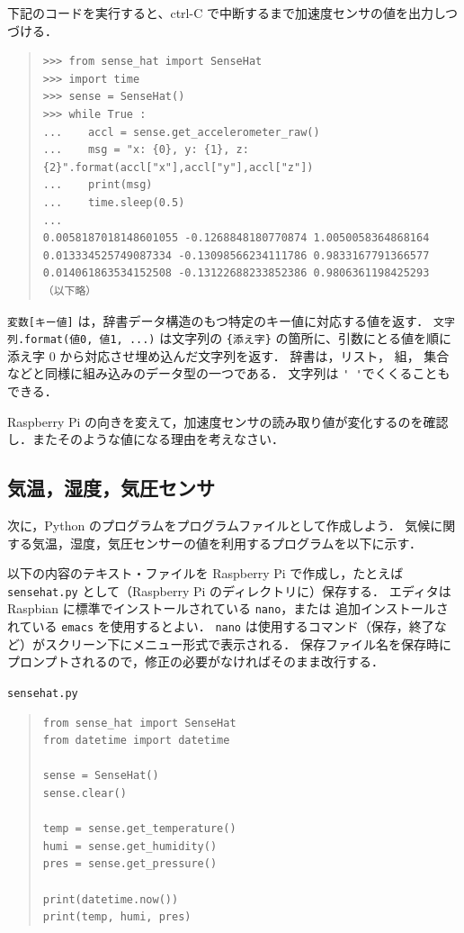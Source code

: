 \documentclass[11pt,a4,epsf]{report}
\begin{document}
下記のコードを実行すると、ctrl-C で中断するまで加速度センサの値を出力しつづける．
\begin{quote}
\small
\begin{verbatim}
>>> from sense_hat import SenseHat 
>>> import time
>>> sense = SenseHat() 
>>> while True :
...    accl = sense.get_accelerometer_raw()
...    msg = "x: {0}, y: {1}, z: {2}".format(accl["x"],accl["y"],accl["z"])
...    print(msg)
...    time.sleep(0.5)
...
0.0058187018148601055 -0.1268848180770874 1.0050058364868164
0.013334525749087334 -0.13098566234111786 0.9833167791366577
0.014061863534152508 -0.13122688233852386 0.9806361198425293
（以下略）
\end{verbatim}
\end{quote}
\verb+変数[キー値]+ は，辞書データ構造のもつ特定のキー値に対応する値を返す．
\verb+文字列.format(値0, 値1, ...)+ は文字列の \verb+{添え字}+ の箇所に、引数にとる値を順に添え字 0 から対応させ埋め込んだ文字列を返す．
辞書は，リスト， 組， 集合などと同様に組み込みのデータ型の一つである．
文字列は \verb+' '+でくくることもできる．

\begin{excercise}
Raspberry Pi の向きを変えて，加速度センサの読み取り値が変化するのを確認し．またそのような値になる理由を考えなさい．
\end{excercise}

\subsection{気温，湿度，気圧センサ}

次に，Python のプログラムをプログラムファイルとして作成しよう．
気候に関する気温，湿度，気圧センサーの値を利用するプログラムを以下に示す．

以下の内容のテキスト・ファイルを Raspberry Pi で作成し，たとえば \verb+sensehat.py+ として（Raspberry Pi のディレクトリに）保存する．
エディタは Raspbian に標準でインストールされている \verb+nano+，または 追加インストールされている \verb+emacs+ を使用するとよい．
\verb+nano+ は使用するコマンド（保存，終了など）がスクリーン下にメニュー形式で表示される．
保存ファイル名を保存時にプロンプトされるので，修正の必要がなければそのまま改行する．
 \begin{itembox}[l]{\tt sensehat.py}
\begin{quote}
\small
\begin{verbatim}
from sense_hat import SenseHat
from datetime import datetime

sense = SenseHat()
sense.clear()

temp = sense.get_temperature()
humi = sense.get_humidity()
pres = sense.get_pressure()
    
print(datetime.now())
print(temp, humi, pres)
\end{verbatim}
\end{quote}
\end{itembox}
\end{document}
